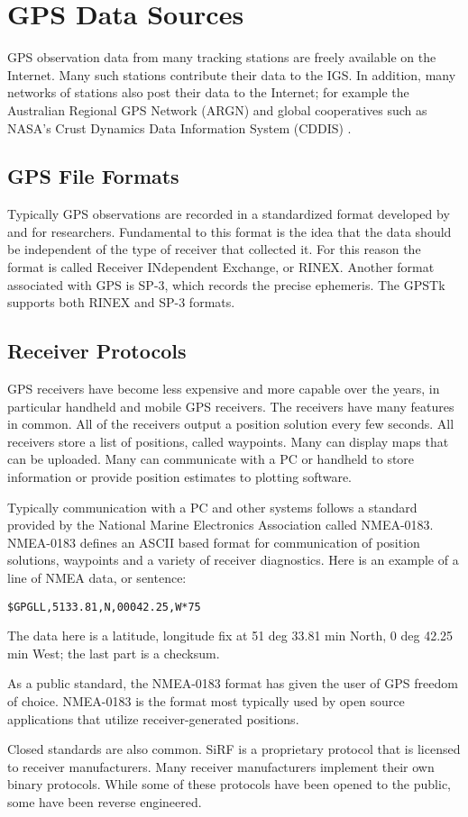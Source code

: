 \section{GPS Data Sources}

GPS observation data from many tracking stations are freely available on the Internet. Many such stations contribute their data to the IGS. In addition, many networks of stations also post their data to the Internet; for example the Australian Regional GPS Network (ARGN) \cite{argn:website} and global cooperatives such as NASA's Crust Dynamics Data Information System (CDDIS) \cite{cddis:website}.

\subsection{GPS File Formats}
Typically GPS observations are recorded in a standardized format developed by and for researchers. Fundamental to this format is the idea that the data should be independent of the type of receiver that collected it. For this reason the format is called Receiver INdependent Exchange, or RINEX. Another format associated with GPS is SP-3, which records the precise ephemeris. The GPSTk supports both RINEX and SP-3 formats.


\subsection{Receiver Protocols}

GPS receivers have become less expensive and more capable over the years, in particular handheld and mobile GPS receivers. The receivers have many features in common. All of the receivers output a position solution every few seconds. All receivers store a list of positions, called waypoints. Many can display maps that can be uploaded. Many can communicate with a PC or handheld to store information or provide position estimates to plotting software.

Typically communication with a PC and other systems follows a standard provided by the National Marine Electronics Association called NMEA-0183. NMEA-0183 defines an ASCII based format for communication of position solutions, waypoints and a variety of receiver diagnostics. Here is an example of a line of NMEA data, or sentence:

\begin{verbatim}
$GPGLL,5133.81,N,00042.25,W*75
\end{verbatim}

The data here is a latitude, longitude fix at 51 deg 33.81 min North, 0 deg 42.25 min West; the last part is a checksum.

As a public standard, the NMEA-0183 format has given the user of GPS freedom of choice. NMEA-0183 is the format most typically used by open source applications that utilize receiver-generated positions.

Closed standards are also common. SiRF is a proprietary protocol that is licensed to receiver manufacturers. Many receiver manufacturers implement their own binary protocols. While some of these protocols have been opened to the public, some have been reverse engineered. 
%
\putbib[gpstk]
%

